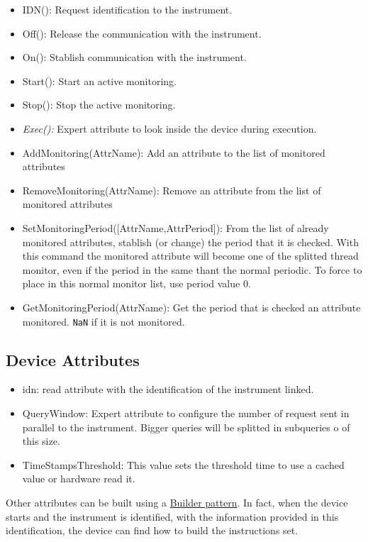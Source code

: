 \documentclass[a4paper,10pt]{article}
\begin{document}
\begin{itemize}
    \item IDN(): Request identification to the instrument.
    \item Off(): Release the communication with the instrument.
    \item On(): Stablish communication with the instrument.
    \item Start(): Start an active monitoring.
    \item Stop(): Stop the active monitoring.
    \item \emph{Exec():} Expert attribute to look inside the device during execution.
    \item AddMonitoring(AttrName): Add an attribute to the list of monitored attributes
    \item RemoveMonitoring(AttrName): Remove an attribute from the list of monitored attributes
    \item SetMonitoringPeriod([AttrName,AttrPeriod]): From the list of already monitored attributes, stablish (or change) the period that it is checked. With this command the monitored attribute will become one of the splitted thread monitor, even if the period in the same thant the normal periodic. To force to place in this normal monitor list, use period value $0$.
    \item GetMonitoringPeriod(AttrName): Get the period that is checked an attribute monitored. {\tt NaN} if it is not monitored.
\end{itemize}

\subsection{Device Attributes}

\begin{itemize}
    \item idn: read attribute with the identification of the instrument linked.
    \item QueryWindow: Expert attribute to configure the number of request sent in parallel to the instrument. Bigger queries will be splitted in subqueries o of this size.
    \item TimeStampsThreshold: This value sets the threshold time to use a cached value or hardware read it.
\end{itemize}

Other attributes can be built using a \href{http://en.wikipedia.org/wiki/Builder_pattern}{Builder pattern}. In fact, when the device starts and the instrument is identified, with the information provided in this identification, the device can find how to build the instructions set.
\end{document}
